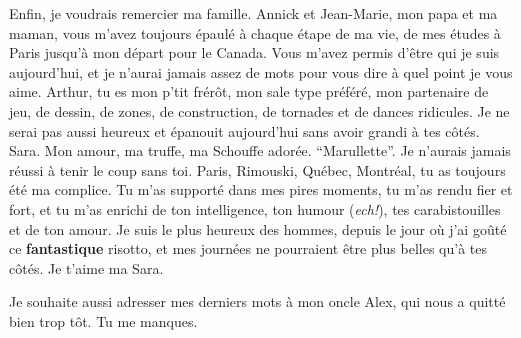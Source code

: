 Enfin, je voudrais remercier ma famille. Annick et Jean-Marie, mon papa
et ma maman, vous m'avez toujours épaulé à chaque étape de ma vie, de
mes études à Paris jusqu'à mon départ pour le Canada. Vous m'avez permis
d'être qui je suis aujourd'hui, et je n'aurai jamais assez de mots pour
vous dire à quel point je vous aime. Arthur, tu es mon p'tit frérôt, mon
sale type préféré, mon partenaire de jeu, de dessin, de zones, de
construction, de tornades et de dances ridicules. Je ne serai pas aussi
heureux et épanouit aujourd'hui sans avoir grandi à tes côtés. Sara. Mon
amour, ma truffe, ma Schouffe adorée. ``Marullette''. Je n'aurais jamais
réussi à tenir le coup sans toi. Paris, Rimouski, Québec, Montréal, tu
as toujours été ma complice. Tu m'as supporté dans mes pires moments, tu
m'as rendu fier et fort, et tu m'as enrichi de ton intelligence, ton
humour (\emph{ech!}), tes carabistouilles et de ton amour. Je suis le
plus heureux des hommes, depuis le jour où j'ai goûté ce
\textbf{fantastique} risotto, et mes journées ne pourraient être plus
belles qu'à tes côtés. Je t'aime ma Sara.

Je souhaite aussi adresser mes derniers mots à mon oncle Alex, qui nous
a quitté bien trop tôt. Tu me manques.
